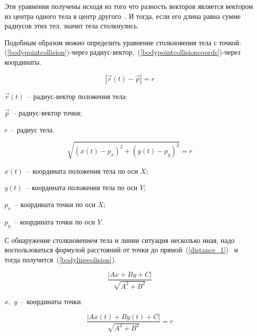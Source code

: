 Эти уравнения получены исходя из того что разность векторов является вектором из центра одного тела в центр другого~\cite[с.~39]{mathforprogrammers}.
И тогда, если его длина равна сумме радиусов этих тел, значит тела столкнулись.

Подобным образом можно определить уравнение столкновения тела с точкой:
(\ref{bodypointcollision})-через радиус-вектор,~(\ref{bodypointcollisioncoords})-через координаты.

\begin{equation}\label{bodypointcollision}
  \left|\vec{r}(t) - \vec{p}\right| = r
\end{equation}
\begin{Underequation}
  \(\vec{r}(t)\)~-- радиус-вектор положения тела;

  \(\vec{p}\)~-- радиус-вектор точки;

  \(r\)~-- радиус тела.
\end{Underequation}

\begin{equation}\label{bodypointcollisioncoords}
  \sqrt{(x(t) - p_x)^2 + (y(t) - p_y)^2} = r
\end{equation}

\begin{Underequation}
  \(x(t)\)~-- координата положения тела по оси \(X\);

  \(y(t)\)~-- координата положения тела по оси \(Y\);

  \(p_x\)~-- координата точки по оси \(X\);

  \(p_y\)~-- координата точки по оси \(Y\).
\end{Underequation}

С обнаружение столкновением тела и линии ситуация несколько иная,
надо воспользоваться формулой расстояний от точки до прямой~(\ref{distance_1})~\cite[с.~452]{larson}
и тогда получится~(\ref{bodylinecolision}).

\begin{equation}\label{distance_1}
  \frac{\left|Ax + By + C\right|}{\sqrt{A^2 + B^2}}
\end{equation}

\begin{Underequation}
  \(x\),~\(y\)~-- координаты точки.
\end{Underequation}

\begin{equation}\label{bodylinecolision}
  \frac{\left|A x(t) + B y(t) + C\right|}{\sqrt{A^2 + B^2}} = r
\end{equation}

